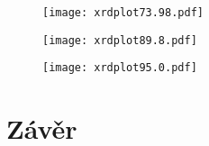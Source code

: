 \documentclass[a4paper,12pt]{article}
\begin{document}
\begin{figure}[h!]
\centering
\texttt{[image: xrdplot73.98.pdf]}
\caption{\centering }
\label{fig:spectrum}
\end{figure}

\begin{figure}[h!]
\centering
\texttt{[image: xrdplot89.8.pdf]}
\caption{\centering }
\label{fig:spectrum}
\end{figure}
	
\begin{figure}[h!]
	\centering
	\texttt{[image: xrdplot95.0.pdf]}
	\caption{\centering }
	\label{fig:spectrum}
\end{figure}
	\clearpage
	\section{Závěr}

	
	
\end{document}
